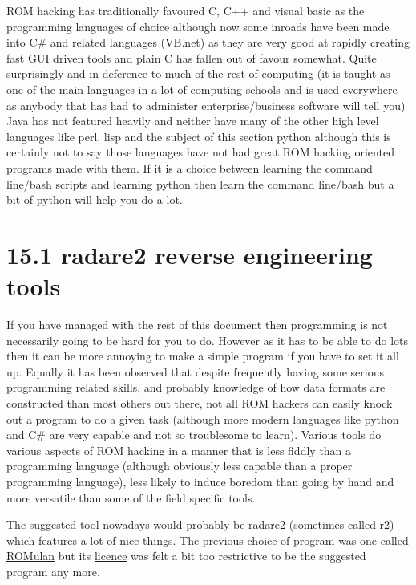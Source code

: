 \documentclass[
]{book}
\begin{document}
ROM hacking has traditionally favoured C, C++ and visual basic as the programming languages of choice although now some inroads have been made into C\# and related languages (VB.net) as they are very good at rapidly creating fast GUI driven tools and plain C has fallen out of favour somewhat. Quite surprisingly and in deference to much of the rest of computing (it is taught as one of the main languages in a lot of computing schools and is used everywhere as anybody that has had to administer enterprise/business software will tell you) Java has not featured heavily and neither have many of the other high level languages like perl, lisp and the subject of this section python although this is certainly not to say those languages have not had great ROM hacking oriented programs made with them. If it is a choice between learning the command line/bash scripts and learning python then learn the command line/bash but a bit of python will help you do a lot.

\hypertarget{radare2-reverse-engineering-tools}{%
\section{15.1 radare2 reverse engineering tools}\label{radare2-reverse-engineering-tools}}

If you have managed with the rest of this document then programming is not necessarily going to be hard for you to do. However as it has to be able to do lots then it can be more annoying to make a simple program if you have to set it all up. Equally it has been observed that despite frequently having some serious programming related skills, and probably knowledge of how data formats are constructed than most others out there, not all ROM hackers can easily knock out a program to do a given task (although more modern languages like python and C\# are very capable and not so troublesome to learn). Various tools do various aspects of ROM hacking in a manner that is less fiddly than a programming language (although obviously less capable than a proper programming language), less likely to induce boredom than going by hand and more versatile than some of the field specific tools.

The suggested tool nowadays would probably be \href{http://www.radare.org/y/?p=documentation}{radare2} (sometimes called r2) which features a lot of nice things. The previous choice of program was one called \href{http://stealth.hapisan.com/ROMulan/}{ROMulan} but its \href{http://stealth.hapisan.com/ROMulan/ROMulan.html\#License}{licence} was felt a bit too restrictive to be the suggested program any more.
\end{document}
